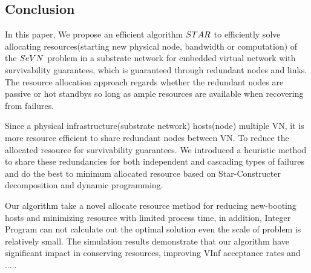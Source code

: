 \subsection{Conclusion}
In this paper, We propose an efficient algorithm $STAR$ to efficiently solve allocating resources(starting new physical node, bandwidth or computation) of the $SeVN$  problem in a substrate network for embedded virtual network with survivability guarantees, which is guaranteed through redundant nodes and links. The resource allocation approach regards whether the redundant nodes are passive or hot standbys so long as ample resources are available when recovering from failures.

Since a physical infrastructure(substrate network) hosts(node) multiple VN, it is more resource efficient to share redundant nodes between VN. To reduce the allocated resource for survivability guarantees. We introduced a heuristic method to share these redundancies for both independent and cascading types of failures and do the best to minimum allocated resource based on Star-Constructer decomposition and dynamic programming.

Our algorithm take a novel allocate resource method for reducing new-booting hosts and minimizing resource with limited process time, in addition, Integer Program can not calculate out the optimal solution even the scale of problem is relatively small. The simulation results demonstrate that our algorithm have significant impact in conserving resources, improving VInf acceptance rates and .....
